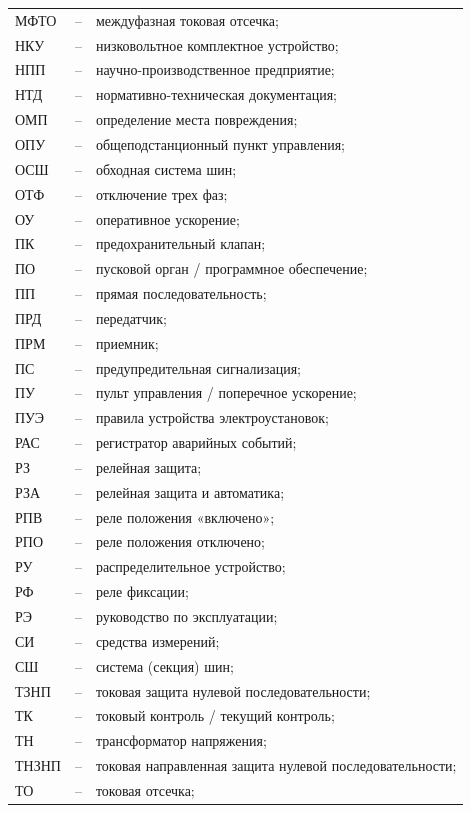 \begin{longtable}{>{\raggedright\arraybackslash}m{2cm}>{\raggedright\arraybackslash}m{0.5cm}>{\raggedright\arraybackslash}m{20cm}}
МФТО & -- & междуфазная токовая отсечка; \\
НКУ & -- & низковольтное комплектное устройство; \\
НПП & -- & научно-производственное предприятие; \\
НТД & -- & нормативно-техническая документация; \\
ОМП & -- & определение места повреждения; \\
ОПУ & -- & общеподстанционный пункт управления; \\
ОСШ & -- & обходная система шин; \\
ОТФ & -- & отключение трех фаз; \\
ОУ & -- & оперативное ускорение; \\
ПК & -- & предохранительный клапан; \\
ПО & -- & пусковой орган / программное обеспечение; \\
ПП & -- & прямая последовательность; \\
ПРД & -- & передатчик; \\
ПРМ & -- & приемник; \\
ПС & -- & предупредительная сигнализация; \\
ПУ & -- & пульт управления / поперечное ускорение; \\
ПУЭ & -- & правила устройства электроустановок; \\
РАС & -- & регистратор аварийных событий; \\
РЗ & -- & релейная защита; \\
РЗА & -- & релейная защита и автоматика; \\
РПВ & -- & реле положения «включено»; \\
РПО & -- & реле положения отключено; \\
РУ & -- & распределительное устройство; \\
РФ & -- & реле фиксации; \\
РЭ & -- & руководство по эксплуатации; \\
СИ & -- & средства измерений; \\
СШ & -- & система (секция) шин; \\
ТЗНП & -- & токовая защита нулевой последовательности; \\
ТК & -- & токовый контроль / текущий контроль; \\
ТН & -- & трансформатор напряжения; \\
ТНЗНП & -- & токовая направленная защита нулевой последовательности; \\
ТО & -- & токовая отсечка; \\

\end{longtable}
